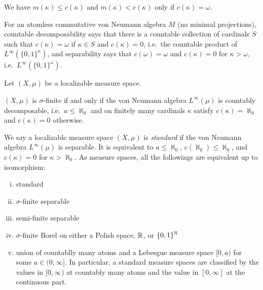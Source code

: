 \documentclass{../../large}
\begin{document}
We have $m(\kappa)\le c(\kappa)$ and $m(\kappa)<c(\kappa)$ only if $c(\kappa)=\omega$.

For an atomless commutative von Neumann algebra $M$ (no minimal projections), countable decomposability says that there is a countable collection of cardinals $S$ such that $c(\kappa)=\omega$ if $\kappa\in S$ and $c(\kappa)=0$, i.e.~the countable product of $L^\infty(\{0,1\}^\kappa)$, and separability says that $c(\omega)=\omega$ and $c(\kappa)=0$ for $\kappa>\omega$, i.e.~$L^\infty(\{0,1\}^\omega)$.



\begin{prb}
Let $(X,\mu)$ be a localizable measure space.
\begin{parts}
\item $(X,\mu)$ is $\sigma$-finite if and only if the von Neumann algebra $L^\infty(\mu)$ is countably decomposable, i.e.~$a\le\aleph_0$ and on finitely many cardinals $\kappa$ satisfy $c(\kappa)=\aleph_0$ and $c(\kappa)=0$ otherwise.
\end{parts}
\end{prb}

\begin{prb}
We say a localizable measure space $(X,\mu)$ is \emph{standard} if the von Neumann algebra $L^\infty(\mu)$ is separable.
It is equivalent to $a\le\aleph_0$, $c(\aleph_0)\le\aleph_0$, and $c(\kappa)=0$ for $\kappa>\aleph_0$.
As measure spaces, all the followings are equivalent up to isomorphism:
\begin{enumerate}[(i)]
\item standard
\item $\sigma$-finite separable
\item semi-finite separable
\item $\sigma$-finite Borel on either a Polish space, $\mathbb{R}$, or $\{0,1\}^{\mathbb{N}}$
\item union of countablly many atoms and a Lebesgue measure space $[0,a)$ for some $a\in(0,\infty]$. In particular, a standard measure spaces are classified by the values in $[0,\infty)$ at countably many atoms and the value in $[0,\infty]$ at the continuous part.
\end{enumerate}
\end{prb}
\end{document}
